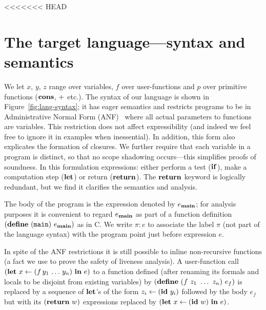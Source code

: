<<<<<<< HEAD


\section{The target language---syntax and semantics}
\label{sec:defs}
We let $x$, $y$, $z$ range over variables, $f$ over user-functions and
$p$ over  primitive functions ($\mbox{$\mathbf{cons}$}$, $\mbox{$\mathbf{ +}$}$ etc.).   The syntax of
our language  is shown  in Figure~\ref{fig:lang-syntax}; it  has eager
semantics and  restricts programs to be in  Administrative Normal Form
(ANF)~\cite{chakravarty03perspective}  where all actual  parameters to
functions   are   variables.   This   restriction   does  not   affect
expressibility (and indeed we feel  free to ignore it in examples when
inessential). In addition, this  form also explicates the formation of
closures.  We further  require  that  each variable  in  a program  is
distinct, so  that no scope shadowing  occurs---this simplifies proofs
of soundness.  In this  formulation expressions: either perform a test
($\mbox{$\mathbf{ if}$}$), make a computation step ($\mbox{$\mathbf{ let}$}$) or return ($\mbox{$\mathbf{ return}$}$).  The
$\mbox{$\mathbf{ return}$}$ keyword is logically redundant, but we find it clarifies the
semantics and analysis.


The body of the program is
the  expression denoted  by  $e_{\mathbf{main}}$; for analysis purposes
it is convenient
to regard $e_{\mathbf{main}}$ as part of a function definition
$(\mbox{$\mathbf{define}$}\ ({\tt main})\ e_{\mathbf{main}})$ as in C\@.
We write  $\pi\!:\!e$ to  associate the label  $\pi$ (not part  of the
language syntax) with the program point just before expression $e$.

In spite of the ANF restrictions it is still possible
to inline non-recursive functions (a fact we use to prove the safety
of liveness analysis).  A user-function call
$(\mbox{$\mathbf{ let}$}\,\, x \leftarrow (f\,y_1\,\ldots\,y_n) \,\, \mbox{$\mathbf{ in}$}\,\, e)$
to a function defined
(after renaming its formals and locals to be disjoint from existing variables)
by $(\DEFINE\ (f\ z_1\ \ldots\ z_n)\ e_f)$
is replaced by a sequence of $\mbox{$\mathbf{ let}$}$'s of the form
$z_i\leftarrow (\mbox{$\mathbf{ id}$}\,\,y_i)$ followed by
the body $e_f$ but with its $(\mbox{$\mathbf{ return}$}\,\,w)$ expressions replaced by
$(\mbox{$\mathbf{ let}$}\,\, x \leftarrow (\mbox{$\mathbf{ id}$}\,\, w) \,\, \mbox{$\mathbf{ in}$}\,\, e)$.

